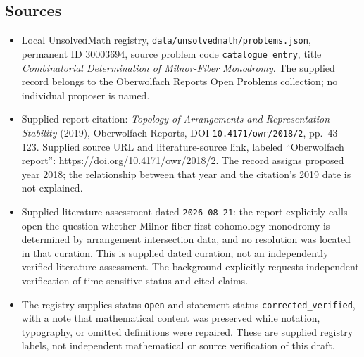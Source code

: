 \documentclass[11pt]{article}
\begin{document}
\subsection{Sources}
\begin{itemize}
\item Local UnsolvedMath registry, \texttt{data/unsolvedmath/problems.json}, permanent ID \(30003694\), source problem code \texttt{catalogue entry}, title \emph{Combinatorial Determination of Milnor-Fiber Monodromy}. The supplied record belongs to the Oberwolfach Reports Open Problems collection; no individual proposer is named.
\item Supplied report citation: \emph{Topology of Arrangements and Representation Stability} (2019), Oberwolfach Reports, DOI \texttt{10.4171/owr/2018/2}, pp.~43--123. Supplied source URL and literature-source link, labeled ``Oberwolfach report'': \url{https://doi.org/10.4171/owr/2018/2}. The record assigns proposed year 2018; the relationship between that year and the citation's 2019 date is not explained.
\item Supplied literature assessment dated \texttt{2026-08-21}: the report explicitly calls open the question whether Milnor-fiber first-cohomology monodromy is determined by arrangement intersection data, and no resolution was located in that curation. This is supplied dated curation, not an independently verified literature assessment. The background explicitly requests independent verification of time-sensitive status and cited claims.
\item The registry supplies status \texttt{open} and statement status \texttt{corrected\_verified}, with a note that mathematical content was preserved while notation, typography, or omitted definitions were repaired. These are supplied registry labels, not independent mathematical or source verification of this draft.
\end{itemize}
\end{document}
